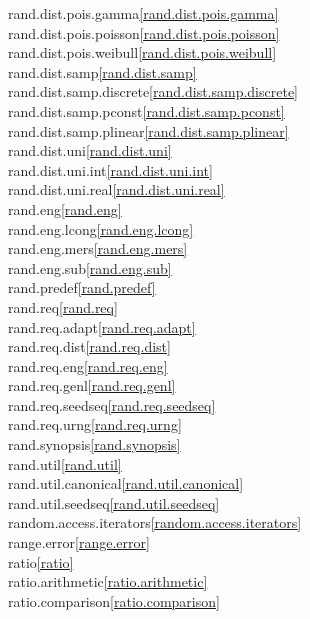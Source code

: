 \begin{multicols}{2}
rand.dist.pois.gamma\quad\ref{rand.dist.pois.gamma}\\
rand.dist.pois.poisson\quad\ref{rand.dist.pois.poisson}\\
rand.dist.pois.weibull\quad\ref{rand.dist.pois.weibull}\\
rand.dist.samp\quad\ref{rand.dist.samp}\\
rand.dist.samp.discrete\quad\ref{rand.dist.samp.discrete}\\
rand.dist.samp.pconst\quad\ref{rand.dist.samp.pconst}\\
rand.dist.samp.plinear\quad\ref{rand.dist.samp.plinear}\\
rand.dist.uni\quad\ref{rand.dist.uni}\\
rand.dist.uni.int\quad\ref{rand.dist.uni.int}\\
rand.dist.uni.real\quad\ref{rand.dist.uni.real}\\
rand.eng\quad\ref{rand.eng}\\
rand.eng.lcong\quad\ref{rand.eng.lcong}\\
rand.eng.mers\quad\ref{rand.eng.mers}\\
rand.eng.sub\quad\ref{rand.eng.sub}\\
rand.predef\quad\ref{rand.predef}\\
rand.req\quad\ref{rand.req}\\
rand.req.adapt\quad\ref{rand.req.adapt}\\
rand.req.dist\quad\ref{rand.req.dist}\\
rand.req.eng\quad\ref{rand.req.eng}\\
rand.req.genl\quad\ref{rand.req.genl}\\
rand.req.seedseq\quad\ref{rand.req.seedseq}\\
rand.req.urng\quad\ref{rand.req.urng}\\
rand.synopsis\quad\ref{rand.synopsis}\\
rand.util\quad\ref{rand.util}\\
rand.util.canonical\quad\ref{rand.util.canonical}\\
rand.util.seedseq\quad\ref{rand.util.seedseq}\\
random.access.iterators\quad\ref{random.access.iterators}\\
range.error\quad\ref{range.error}\\
ratio\quad\ref{ratio}\\
ratio.arithmetic\quad\ref{ratio.arithmetic}\\
ratio.comparison\quad\ref{ratio.comparison}\\

\end{multicols}
